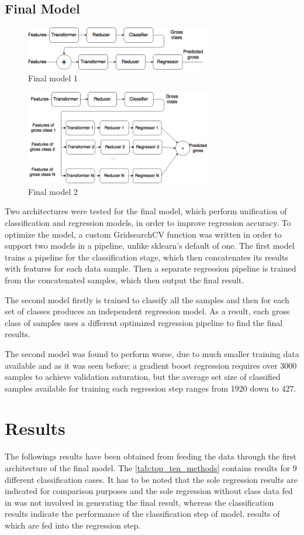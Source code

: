 \subsection{Final Model}
\begin{figure}[h]
\label{fig:final_model}
\centering
\includegraphics[width=3.2in]{figures/fm1}
\caption{Final model 1}
\label{fig:model1}
\end{figure}
\begin{figure}[h]
\centering
\includegraphics[width=3.2in]{figures/fm2}
\caption{Final model 2}
\label{fig:model2}
\end{figure}
Two architectures were tested for the final model, which perform unification of classification and regression models, in order to improve regression accuracy. To optimize the model, a custom GridsearchCV function was written in order to support two models in a pipeline, unlike sklearn's default of one. The first model trains a pipeline for the classification stage, which then concatenates its results with features for each data sample. Then a separate regression pipeline is trained from the concatenated samples, which then output the final result.

The second model firstly is trained to classify all the samples and then for each set of classes produces an independent regression model. As a result, each gross class of samples uses a different optimized regression pipeline to find the final results.

The second model was found to perform worse, due to much smaller training data available and as it was seen before; a gradient boost regression requires over 3000 samples to achieve validation saturation, but the average set size of classified samples available for training each regression step  ranges from 1920 down to 427.

\section{Results}
The followings results have been obtained from feeding the data through the first architecture of the final model. The \tablename{} \ref{tab:top_ten_methods} contains results for 9 different classification cases. It has to be noted that the sole regression results are indicated for comparison purposes and the sole regression without class data fed in was not involved in generating the final result, whereas the classification results indicate the performance of the classification step of model, results of which are fed into the regression step.

